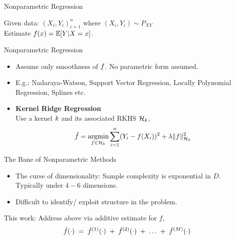 
\begin{frame}{Nonparametric Regression}

  Given data: $(X_i, Y_i)_{i=1}^n$ \hspace{0.1in} where $(X_i,Y_i)\sim P_{XY}$ \\ 
  Estimate $f(x) = \mathbb{E}[Y| X=x]$.
  \vspace{0.1in}
  \pause

  Nonparametric Regression
  \begin{itemize}
    \item Assume only smoothness of $f$. No parametric form assumed.
    \item E.g.: Nadaraya-Watson, Support Vector Regression, Locally Polynomial
          Regression, Splines etc.
    \vspace{0.15in}
    \pause
    \item \textbf{Kernel Ridge Regression} \\
      Use a kernel $k$ and its associated RKHS ${\mathcal{H}_{k}}$,
      \[ \hat{f} = \mathop{\mathrm{argmin}}_{f\in {\mathcal{H}_{k}}} \sum_{i=1}^n (Y_i - f(X_i))^2 
          + \lambda \|f\|^2_{{\mathcal{H}_{k}}}
      \]
  \end{itemize}

\end{frame}

\begin{frame}{The Bane of Nonparametric Methods}

  \begin{itemize}
    \item The curse of dimensionality: Sample complexity is exponential in $D$.
          Typically under $4-6$ dimensions.
    \item Difficult to identify/ exploit  structure in the problem.
  \end{itemize}
  \pause
  \vspace{0.4in}

  This work: Address above via additive estimate for $f$,
  \[
    \hat{f}(\cdot) \;=\; \hat{f}^{(1)}(\cdot)\; +\;  
      \hat{f}^{(2)}(\cdot)\;+\;\dots \;+\; \hat{f}^{(M)}(\cdot)
  \]
\end{frame}


